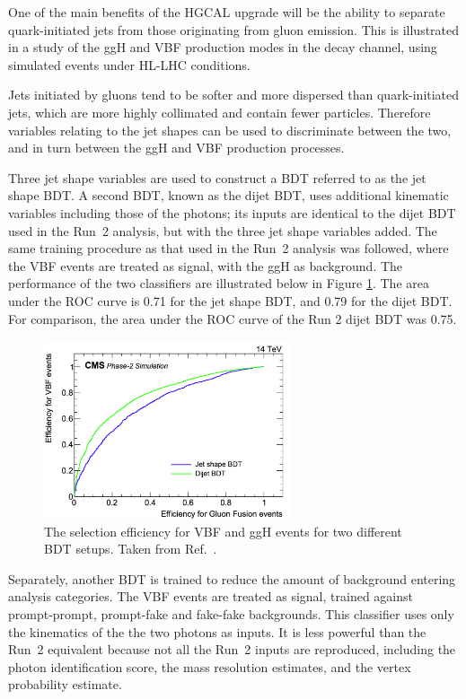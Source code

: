 One of the main benefits of the HGCAL upgrade will be the ability to separate quark-initiated jets from those originating from gluon emission.
This is illustrated in a study of the ggH and VBF production modes in the \Hgg decay channel, using simulated events under HL-LHC conditions.

Jets initiated by gluons tend to be softer and more dispersed than quark-initiated jets, which are more highly collimated and contain fewer particles. 
Therefore variables relating to the jet shapes can be used to discriminate between the two, and in turn between the ggH and VBF production processes.

Three jet shape variables are used to construct a BDT referred to as the jet shape BDT.
A second BDT, known as the dijet BDT, uses additional kinematic variables including those of the photons; 
its inputs are identical to the dijet BDT used in the Run~2 analysis, but with the three jet shape variables added.
The same training procedure as that used in the Run~2 analysis was followed, 
where the VBF events are treated as signal, with the ggH as background.
The performance of the two classifiers are illustrated below in Figure \ref{fig:hgcal_VBFvsGGH}.
The area under the ROC curve is 0.71 for the jet shape BDT, and 0.79 for the dijet BDT.
For comparison, the area under the ROC curve of the Run 2 dijet BDT was 0.75.

\begin{figure}[h!]
  \centering
  \includegraphics[width=0.65\textwidth]{Figures/HGCAL/VBFvsGGH.png}
  \caption{The selection efficiency for VBF and ggH events for two different BDT setups. Taken from Ref.~\cite{HGCAL}.}
  \label{fig:hgcal_VBFvsGGH}
\end{figure}

Separately, another BDT is trained to reduce the amount of background entering analysis categories.
The VBF events are treated as signal, trained against prompt-prompt, prompt-fake and fake-fake \Hgg backgrounds.
This classifier uses only the kinematics of the the two photons as inputs. 
It is less powerful than the Run~2 equivalent because not all the Run~2 inputs are reproduced, 
including the photon identification score, the mass resolution estimates, and the vertex probability estimate.

